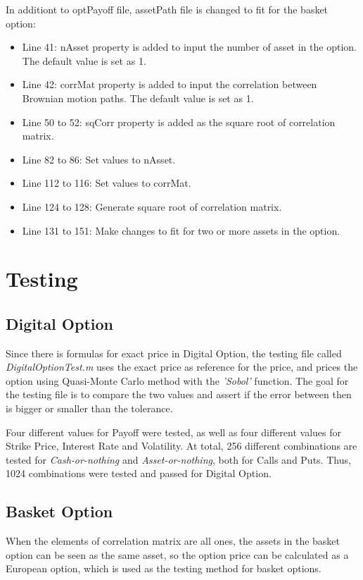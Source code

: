 \documentclass[]{elsarticle}
\theoremstyle{definition}
\theoremstyle{remark}
\begin{document}
In additiont to optPayoff file, assetPath file is changed to fit for the basket option:
\begin{itemize}
\item Line 41: nAsset property is added to input the number of asset in the option. The default value is set as 1.
\item Line 42: corrMat property is added to input the correlation between Brownian motion paths. The default value is set as 1.
\item Line 50 to 52: sqCorr property is added as the square root of correlation matrix.
\item Line 82 to 86: Set values to nAsset.
\item Line 112 to 116: Set values to corrMat.
\item Line 124 to 128: Generate square root of correlation matrix.
\item Line 131 to 151: Make changes to fit for two or more assets in the option.
\end{itemize}

\section{Testing}
\subsection{Digital Option}
Since there is formulas for exact price in Digital Option, the testing file called \textit{DigitalOptionTest.m} uses the exact price as reference for the price, and prices the option using Quasi-Monte Carlo method with the \textit{'Sobol'} function. The goal for the testing file is to compare the two values and assert if the error between then is bigger or smaller than the tolerance. 

Four different values for Payoff were tested, as well as four different values for Strike Price, Interest Rate and Volatility. At total, 256 different combinations are tested for \textit{Cash-or-nothing} and \textit{Asset-or-nothing}, both for Calls and Puts. Thus, 1024 combinations were tested and passed for Digital Option.


\subsection{Basket Option}

When the elements of correlation matrix are all ones, the assets in the basket option can be seen as the same asset, so the option price can be calculated as a European option, which is used as the testing method for basket options.
\end{document}
